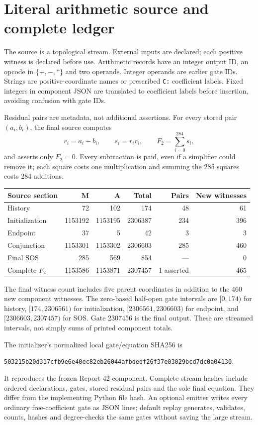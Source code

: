 \documentclass[11pt,letterpaper]{article}
\theoremstyle{definition}\newtheorem{definition}[theorem]{Definition}
\theoremstyle{remark}\newtheorem{remark}[theorem]{Remark}
\newcommand{\codeu}[1]{\nolinkurl{#1}}
\begin{document}
\section{Literal arithmetic source and complete ledger}\label{ptr:pc:sec:source}
The source is a topological stream. External inputs are declared; each positive witness is declared before use. Arithmetic records have an integer output ID, an opcode in $\{+,-,*\}$ and two operands. Integer operands are earlier gate IDs. Strings are positive-coordinate names or prescribed \codeu{C:} coefficient labels. Fixed integers in component JSON are translated to coefficient labels before insertion, avoiding confusion with gate IDs.

Residual pairs are metadata, not additional assertions. For every stored pair $(a_i,b_i)$, the final source computes
\[
 r_i=a_i-b_i,\qquad s_i=r_i r_i,\qquad F_2=\sum_{i=0}^{284}s_i,
\]
and asserts only $F_2=0$. Every subtraction is paid, even if a simplifier could remove it; each square costs one multiplication and summing the 285 squares costs 284 additions.
\begin{center}\small
\begin{tabular}{@{}lrrrrr@{}}\toprule
Source section&M&A&Total&Pairs&New witnesses\\\midrule
History&72&102&174&48&61\\
Initialization&1153192&1153195&2306387&234&396\\
Endpoint&37&5&42&3&3\\\midrule
Conjunction&1153301&1153302&2306603&285&460\\
Final SOS&285&569&854&---&0\\\midrule
Complete $F_2$&1153586&1153871&2307457&1 asserted&465\\\bottomrule
\end{tabular}\end{center}
The final witness count includes five parent coordinates in addition to the 460 new component witnesses. The zero-based half-open gate intervals are $[0,174)$ for history, $[174,2306561)$ for initialization, $[2306561,2306603)$ for endpoint, and $[2306603,2307457)$ for SOS. Gate 2307456 is the final output. These are streamed intervals, not simply sums of printed component totals.

The initializer's normalized local gate/equation SHA256 is
\begin{center}\small\codeu{503215b20d317cfb9e6e40ec82eb26044afbdedf26f37e03029bcd7dc0a04130}.\end{center}
It reproduces the frozen Report 42 component. Complete stream hashes include ordered declarations, gates, stored residual pairs and the sole final equation. They differ from the implementing Python file hash. An optional emitter writes every ordinary free-coefficient gate as JSON lines; default replay generates, validates, counts, hashes and degree-checks the same gates without saving the large stream.
\end{document}
